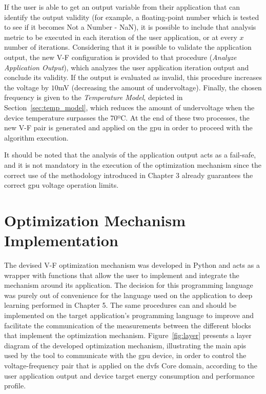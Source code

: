 If the user is able to get an output variable from their application that can identify the output validity (for example, a floating-point number which is tested to see if it becomes Not a Number - NaN), it is possible to include that analysis metric to be executed in each iteration of the user application, or at every $x$ number of iterations.
Considering that it is possible to validate the application output, the new V-F configuration is provided to that procedure (\textit{Analyze Application Output}), which analyzes the user application iteration output and conclude its validity. If the output is evaluated as invalid, this procedure increases the voltage by $10$mV (decreasing the amount of undervoltage). Finally, the chosen frequency is given to the \textit{Temperature Model}, depicted in Section~\ref{sec:temp_model}, which reduces the amount of undervoltage when the device temperature surpasses the 70ºC.  At the end of these two processes, the new V-F pair is generated and applied on the \acrshort{gpu} in order to proceed with the algorithm execution.

It should be noted that the analysis of the application output acts as a fail-safe, and it is not mandatory in the execution of the optimization mechanism since the correct use of the methodology introduced in Chapter 3 already guarantees the correct \acrshort{gpu} voltage operation limits.




\section{Optimization Mechanism Implementation}
\label{sec:implementation}

The devised V-F optimization mechanism was developed in Python and acts as a wrapper with functions that allow the user to implement and integrate the mechanism around its application. The decision for this programming language was purely out of convenience for the language used on the application to deep learning performed in Chapter 5. The same procedures can and should be implemented on the target application's programming language to improve and facilitate the communication of the measurements between the different blocks that implement the optimization mechanism.
Figure~\ref{fig:layer} presents a layer diagram of the developed optimization mechanism, illustrating the main \acrshort{api}s used by the tool to communicate with the \acrshort{gpu} device, in order to control the voltage-frequency pair that is applied on the \acrshort{dvfs} Core domain, according to the user application output and device target energy consumption and performance profile.

